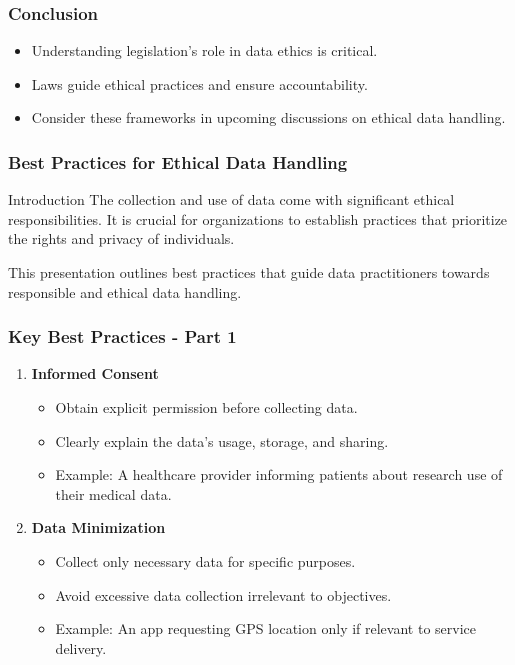 \documentclass[aspectratio=169]{beamer}
\begin{document}
\begin{frame}[fragile]
    \frametitle{Conclusion}
    \begin{itemize}
        \item Understanding legislation's role in data ethics is critical.
        \item Laws guide ethical practices and ensure accountability.
        \item Consider these frameworks in upcoming discussions on ethical data handling.
    \end{itemize}
\end{frame}

\begin{frame}[fragile]
    \frametitle{Best Practices for Ethical Data Handling}
    \begin{block}{Introduction}
        The collection and use of data come with significant ethical responsibilities. It is crucial for organizations to establish practices that prioritize the rights and privacy of individuals.
    \end{block}
    This presentation outlines best practices that guide data practitioners towards responsible and ethical data handling.
\end{frame}

\begin{frame}[fragile]
    \frametitle{Key Best Practices - Part 1}
    \begin{enumerate}
        \item \textbf{Informed Consent}
            \begin{itemize}
                \item Obtain explicit permission before collecting data.
                \item Clearly explain the data's usage, storage, and sharing.
                \item Example: A healthcare provider informing patients about research use of their medical data.
            \end{itemize}
        \item \textbf{Data Minimization}
            \begin{itemize}
                \item Collect only necessary data for specific purposes.
                \item Avoid excessive data collection irrelevant to objectives.
                \item Example: An app requesting GPS location only if relevant to service delivery.
            \end{itemize}
    \end{enumerate}
\end{frame}
\end{document}
